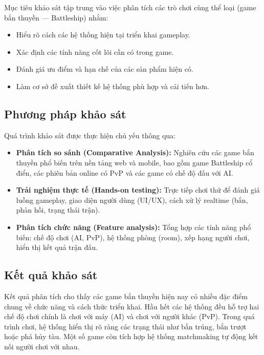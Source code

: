 \documentclass[13pt, a4paper]{extreport}
\begin{document}
Mục tiêu khảo sát tập trung vào việc phân tích các trò chơi cùng thể loại (game bắn thuyền —
Battleship) nhằm:

\begin{itemize}
  \item Hiểu rõ cách các hệ thống hiện tại triển khai gameplay.
  \item Xác định các tính năng cốt lõi cần có trong game.
  \item Đánh giá ưu điểm và hạn chế của các sản phẩm hiện có.
  \item Làm cơ sở đề xuất thiết kế hệ thống phù hợp và cải tiến hơn.
\end{itemize}

\subsection{Phương pháp khảo sát}

Quá trình khảo sát được thực hiện chủ yếu thông qua:

\begin{itemize}
  \item \textbf{Phân tích so sánh (Comparative Analysis):} Nghiên cứu các game bắn thuyền phổ biến
    trên nền tảng web và mobile, bao gồm game Battleship cổ điển, các phiên bản online có PvP và
    các game có chế độ đấu với AI.

  \item \textbf{Trải nghiệm thực tế (Hands-on testing):} Trực tiếp chơi thử để đánh giá luồng
    gameplay, giao diện người dùng (UI/UX), cách xử lý realtime (bắn, phản hồi, trạng thái trận).

  \item \textbf{Phân tích chức năng (Feature analysis):} Tổng hợp các tính năng phổ biến: chế độ
    chơi (AI, PvP), hệ thống phòng (room), xếp hạng người chơi, hiển thị kết quả trận đấu.
\end{itemize}

\subsection{Kết quả khảo sát}

Kết quả phân tích cho thấy các game bắn thuyền hiện nay có nhiều đặc điểm chung về chức năng và
cách thức triển khai. Hầu hết các hệ thống đều hỗ trợ hai chế độ chơi chính là chơi với máy (AI)
và chơi với người khác (PvP). Trong quá trình chơi, hệ thống hiển thị rõ ràng các trạng thái như
bắn trúng, bắn trượt hoặc phá hủy tàu. Một số game còn tích hợp hệ thống matchmaking tự động kết
nối người chơi với nhau.
\end{document}
